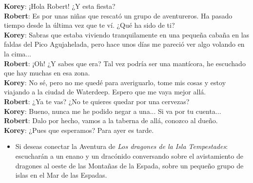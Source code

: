 \documentclass[10pt,twoside,twocolumn,openany]{dndbook}
\begin{document}
\begin{DndReadAloud}
  \textbf{Korey}: ¡Hola Robert! ¿Y esta fiesta? \\
  \textbf{Robert}: Es por unas niñas que rescató un grupo de aventureros. Ha pasado tiempo 
  desde la última vez que te ví. ¿Qué ha sido de ti? \\
  \textbf{Korey}: Sabras que estaba viviendo tranquilamente en una pequeña cabaña en las faldas
  del Pico Agujahelada, pero hace unos días me pareció ver algo volando en la cima... \\
  \textbf{Robert}: ¡Oh! ¿Y sabes que era? Tal vez podría ser una mantícora, he escuchado que 
  hay muchas en esa zona. \\
  \textbf{Korey}: No sé, pero no me quedé para averiguarlo, tome mis cosas y estoy viajando a la 
  ciudad de Waterdeep. Espero que me vaya mejor allá. \\
  \textbf{Robert}: ¿Ya te vas? ¿No te quieres quedar por una cervezas? \\
  \textbf{Korey}: Bueno, nunca me he podido negar a una... Si va por tu cuenta... \\
  \textbf{Robert}: Dalo por hecho, vamos a la taberna de allá, conozco al dueño. \\
  \textbf{Korey}: ¿Pues que esperamos? Para ayer es tarde.
\end{DndReadAloud}

\begin{itemize}
  \item Si deseas conectar la Aventura de \emph{Los dragones de la Isla Tempestades}: escucharán 
  a un enano y un dracónido conversando sobre el avistamiento de dragones al oeste de las Montañas 
  de la Espada, sobre un pequeño grupo de islas en el Mar de las Espadas. 
\end{itemize} 
\end{document}
